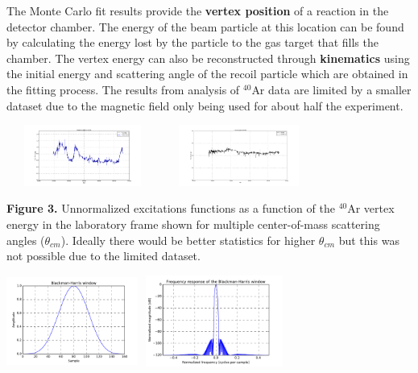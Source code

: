 \documentclass[a0paper,portrait]{baposter}
\begin{document}
\begin{poster}
{\small{The Monte Carlo fit results provide the \textbf{vertex position} of a reaction in the detector chamber. The energy of the beam particle at this location can be found by calculating the energy lost by the particle to the gas target that fills the chamber. The vertex energy can also be reconstructed through \textbf{kinematics} using the initial energy and scattering angle of the recoil particle which are obtained in the fitting process. The results from analysis of $^{40}$Ar data are limited by a smaller dataset due to the magnetic field only being used for about half the experiment.}
\begin{center}
\includegraphics [height=20mm, width=50mm] {curvaJ1415.jpg}
\hspace{.5cm}
\includegraphics [height=20mm, width=50mm] {curvaJ1653.jpg}
\end{center}
\small{\textbf{Figure 3.} Unnormalized excitations functions as a function of the $^{40}$Ar vertex energy in the laboratory frame shown for multiple center-of-mass scattering angles ($\theta_{cm}$). Ideally there would be better statistics for higher $\theta_{cm}$ but this was not possible due to the limited dataset.}
\begin{center}
\includegraphics [height=30mm, width=43mm] {BH.pdf}
\hspace{.3cm}
\includegraphics [height=30mm, width=48mm] {FFTBH.pdf}
\hspace{.3cm}

\end{center}}
\end{poster}
\end{document}
